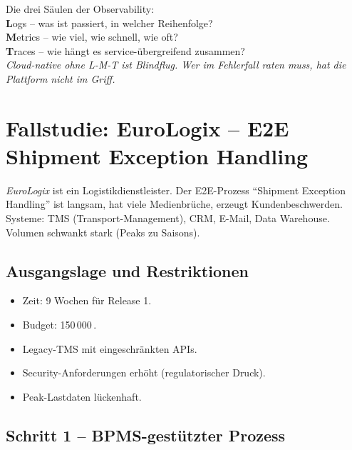 \documentclass[11pt,a4paper,oneside]{article}
\newcommand{\caveatfontfallback}{\itshape}
\newcommand\caveatfont{\caveatfontfallback}%
\newcommand{\akzent}[1]{{\caveatfont\color{lpAmber}#1}}
\begin{document}
\begin{eselsbox}[Eselsbrücke: \akzent{L-M-T}]
Die drei Säulen der Observability:\\[2pt]
\textbf{L}ogs -- was ist passiert, in welcher Reihenfolge?\\
\textbf{M}etrics -- wie viel, wie schnell, wie oft?\\
\textbf{T}races -- wie hängt es service-übergreifend zusammen?\\[2pt]
\emph{Cloud-native ohne L-M-T ist Blindflug. Wer im Fehlerfall raten muss, hat die Plattform nicht im Griff.}
\end{eselsbox}

\section{Fallstudie: EuroLogix -- E2E Shipment Exception Handling}

\emph{EuroLogix} ist ein Logistikdienstleister. Der E2E-Prozess ``Shipment Exception Handling'' ist langsam, hat viele Medienbrüche, erzeugt Kundenbeschwerden. Systeme: TMS (Transport-Management), CRM, E-Mail, Data Warehouse. Volumen schwankt stark (Peaks zu Saisons).

\subsection{Ausgangslage und Restriktionen}

\begin{itemize}
  \item Zeit: 9 Wochen für Release 1.
  \item Budget: 150\,000\,\text{\euro}.
  \item Legacy-TMS mit eingeschränkten APIs.
  \item Security-Anforderungen erhöht (regulatorischer Druck).
  \item Peak-Lastdaten lückenhaft.
\end{itemize}

\subsection{Schritt 1 -- BPMS-gestützter Prozess}
\end{document}

